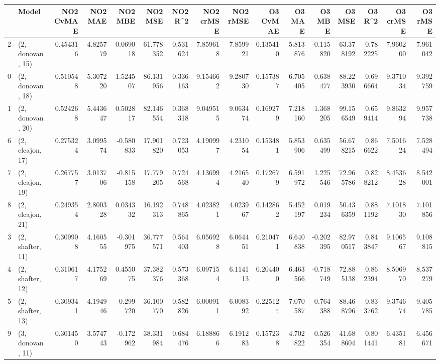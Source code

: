 \begin{tabular}{llrrrrrrrrrrrrrr}
\toprule
{} &             Model &  NO2 CvMAE &   NO2 MAE &   NO2 MBE &    NO2 MSE &   NO2 R\textasciicircum2 &  NO2 crMSE &  NO2 rMSE &  O3 CvMAE &     O3 MAE &     O3 MBE &      O3 MSE &    O3 R\textasciicircum2 &   O3 crMSE &    O3 rMSE \\
\midrule
2  &  (2, donovan, 15) &   0.454316 &  4.825779 &  0.069018 &  61.778352 &  0.531624 &   7.859618 &  7.859921 &  0.135410 &   5.813876 &  -0.115820 &   63.378192 &  0.782225 &   7.960200 &   7.961042 \\
0  &  (2, donovan, 18) &   0.510548 &  5.307220 &  1.524507 &  86.131956 &  0.336163 &   9.154662 &  9.280730 &  0.157387 &   6.705405 &   0.638477 &   88.223930 &  0.696664 &   9.371034 &   9.392759 \\
1  &  (2, donovan, 20) &   0.524268 &  5.443647 &  0.502817 &  82.146554 &  0.368318 &   9.049515 &  9.063474 &  0.169279 &   7.218160 &   1.368205 &   99.156549 &  0.659414 &   9.863294 &   9.957738 \\
6  &  (2, elcajon, 17) &   0.275324 &  3.099574 & -0.580833 &  17.901820 &  0.723053 &   4.190997 &  4.231054 &  0.153481 &   5.853906 &   0.635499 &   56.678215 &  0.866622 &   7.501624 &   7.528494 \\
7  &  (2, elcajon, 19) &   0.267757 &  3.013706 & -0.815158 &  17.779205 &  0.724568 &   4.136994 &  4.216540 &  0.172679 &   6.591972 &   1.225546 &   72.965786 &  0.828212 &   8.453628 &   8.542001 \\
8  &  (2, elcajon, 21) &   0.249354 &  2.800328 &  0.034332 &  16.192313 &  0.748865 &   4.023821 &  4.023967 &  0.142862 &   5.452197 &   0.019234 &   50.436359 &  0.881192 &   7.101830 &   7.101856 \\
3  &  (2, shafter, 11) &   0.309908 &  4.160555 & -0.301975 &  36.777571 &  0.564403 &   6.056928 &  6.064451 &  0.210471 &   6.640838 &  -0.202395 &   82.970517 &  0.843847 &   9.106567 &   9.108815 \\
4  &  (2, shafter, 12) &   0.310617 &  4.175269 &  0.455075 &  37.382376 &  0.573368 &   6.097154 &  6.114113 &  0.204400 &   6.463566 &  -0.718749 &   72.885138 &  0.862394 &   8.506970 &   8.537279 \\
5  &  (2, shafter, 13) &   0.309341 &  4.194946 & -0.299720 &  36.100770 &  0.582826 &   6.000911 &  6.008392 &  0.225124 &   7.070587 &   0.764388 &   88.468796 &  0.833762 &   9.374674 &   9.405785 \\
9  &  (3, donovan, 11) &   0.301450 &  3.574743 & -0.172962 &  38.331984 &  0.684476 &   6.188866 &  6.191283 &  0.157238 &   4.702822 &   0.526354 &   41.688604 &  0.801441 &   6.435181 &   6.456671 \\

\end{tabular}
